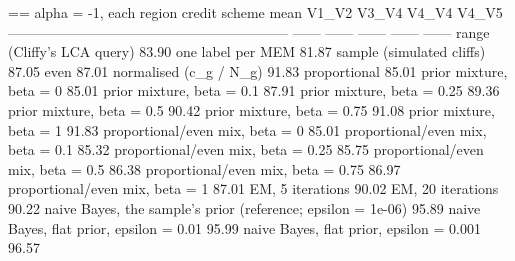 == alpha = -1, each region
  credit scheme                                                   mean   V1_V2   V3_V4   V4_V4   V4_V5
  ------------------------------------------------------------  ------  ------  ------  ------  ------
  range (Cliffy's LCA query)                                    83.90%
  one label per MEM                                             81.87%
  sample (simulated cliffs)                                     87.05%
  even                                                          87.01%
  normalised (c_g / N_g)                                        91.83%
  proportional                                                  85.01%
  prior mixture, beta = 0                                       85.01%
  prior mixture, beta = 0.1                                     87.91%
  prior mixture, beta = 0.25                                    89.36%
  prior mixture, beta = 0.5                                     90.42%
  prior mixture, beta = 0.75                                    91.08%
  prior mixture, beta = 1                                       91.83%
  proportional/even mix, beta = 0                               85.01%
  proportional/even mix, beta = 0.1                             85.32%
  proportional/even mix, beta = 0.25                            85.75%
  proportional/even mix, beta = 0.5                             86.38%
  proportional/even mix, beta = 0.75                            86.97%
  proportional/even mix, beta = 1                               87.01%
  EM, 5 iterations                                              90.02%
  EM, 20 iterations                                             90.22%
  naive Bayes, the sample's prior (reference; epsilon = 1e-06)  95.89%
  naive Bayes, flat prior, epsilon = 0.01                       95.99%
  naive Bayes, flat prior, epsilon = 0.001                      96.57%
